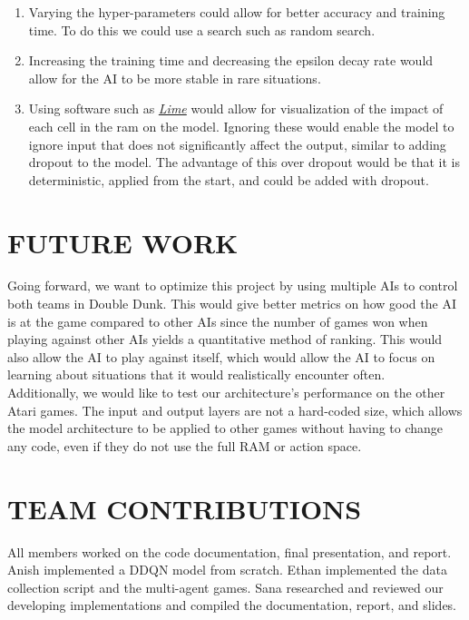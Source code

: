 \documentclass[letterpaper, 10 pt, conference]{ieeeconf}
\begin{document}
\begin{enumerate}
    \item  Varying the hyper-parameters could allow for better accuracy and training time. To do this we could use a search such as random search. \\

    \item  Increasing the training time and decreasing the epsilon decay rate would allow for the AI to be more stable in rare situations. \\

    \item  Using software such as \href{https://github.com/marcotcr/lime/blob/master/README.md}{\textit{Lime}} would allow for visualization of the impact of each cell in the ram on the model. Ignoring these would enable the model to ignore input that does not significantly affect the output, similar to adding dropout to the model. The advantage of this over dropout would be that it is deterministic, applied from the start, and could be added with dropout. \\
\end{enumerate}

\section{\textbf{FUTURE WORK}}
\vspace{.5cm}
Going forward, we want to optimize this project by using multiple AIs to control both teams in Double Dunk. This would give better metrics on how good the AI is at the game compared to other AIs since the number of games won when playing against other AIs yields a quantitative method of ranking. This would also allow the AI to play against itself, which would allow the AI to focus on learning about situations that it would realistically encounter often. \\

Additionally, we would like to test our architecture's performance on the other Atari games. The input and output layers are not a hard-coded size, which allows the model architecture to be applied to other games without having to change any code, even if they do not use the full RAM or action space.\\

\section{\textbf{TEAM CONTRIBUTIONS}}
\vspace{.5cm}
 All members worked on the code documentation, final presentation, and report. Anish implemented a DDQN model from scratch. Ethan implemented the data collection script and the multi-agent games. Sana researched and reviewed our developing implementations and compiled the documentation, report, and slides. \\
\end{document}
